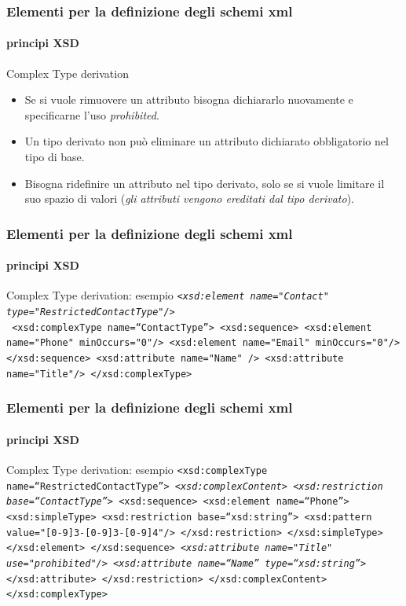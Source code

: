 \begin{frame}
	\frametitle{Elementi per la definizione degli schemi xml}
	\framesubtitle{principi XSD}
	\addtocounter{nframe}{1}

	
	\begin{block}{Complex Type derivation}
		\begin{itemize}
			\item Se si vuole rimuovere un attributo bisogna dichiararlo nuovamente e specificarne l'uso \textit{prohibited}.
			\item Un tipo derivato non può eliminare un attributo dichiarato obbligatorio nel tipo di base.
			\item Bisogna ridefinire un attributo nel tipo derivato, solo se si vuole limitare il suo spazio di valori (\textit{gli attributi vengono ereditati dal tipo derivato}).
		\end{itemize}
	\end{block}
\end{frame}



\begin{frame}
	\frametitle{Elementi per la definizione degli schemi xml}
	\framesubtitle{principi XSD}
	\addtocounter{nframe}{1}

	\begin{block}{Complex Type derivation: esempio}
		\texttt{\emph{<xsd:element name="Contact" type="RestrictedContactType"/>}}
		\\\texttt{%
			<xsd:complexType name=``ContactType''>
			<xsd:sequence>
			<xsd:element name="Phone" minOccurs="0"/>
			<xsd:element name="Email" minOccurs="0"/>
			</xsd:sequence>
			<xsd:attribute name="Name" />
			<xsd:attribute name="Title"/>
			</xsd:complexType>}
	\end{block}
\end{frame}

\begin{frame}
	\frametitle{Elementi per la definizione degli schemi xml}
	\framesubtitle{principi XSD}
	\addtocounter{nframe}{1}

	\begin{block}{Complex Type derivation: esempio}
		\texttt{<xsd:complexType name=``RestrictedContactType''>
		\emph{<xsd:complexContent>}
		\emph{<xsd:restriction base=``ContactType''>}
		<xsd:sequence>
		<xsd:element name=``Phone''>
		<xsd:simpleType>
		<xsd:restriction base=``xsd:string''>
		<xsd:pattern value="[0-9]{3}-[0-9]{3}-[0-9]{4}"/>
		</xsd:restriction>
		</xsd:simpleType>
		</xsd:element>
		</xsd:sequence>
		\emph{<xsd:attribute name="Title" use="prohibited"/>}
		\emph{<xsd:attribute name=``Name'' type=``xsd:string''>}
		</xsd:attribute>
		</xsd:restriction>
		</xsd:complexContent>
		</xsd:complexType>}
	\end{block}
\end{frame}


